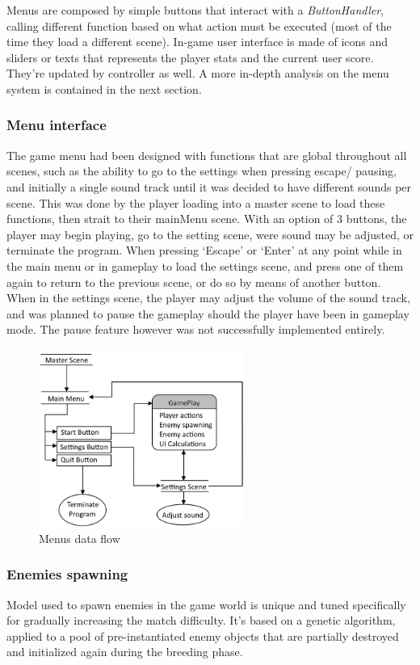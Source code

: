 \documentclass[11pt]{article}
\begin{document}
Menus are composed by simple buttons that interact with a \textit{ButtonHandler}, calling different function based on what action must be executed (most of the time they load a different scene).
In-game user interface is made of icons and sliders or texts that represents the player stats and the current user score. They're updated by controller as well. A more in-depth analysis on the menu system is contained in the next section.

\subsubsection{Menu interface}
The game menu had been designed with functions that are global throughout all scenes, such as the ability to go to the settings when pressing escape/ pausing, and initially a single sound track until it was decided to have different sounds per scene. This was done by the player loading into a master scene to load these functions, then strait to their mainMenu scene. 
With an option of 3 buttons, the player may begin playing, go to the setting scene, were sound may be adjusted, or terminate the program. When pressing ‘Escape’ or ‘Enter’ at any point while in the main menu or in gameplay to load the settings scene, and press one of them again to return to the previous scene, or do so by means of another button. 
When in the settings scene, the player may adjust the volume of the sound track, and was planned to pause the gameplay should the player have been in gameplay mode. The pause feature however was not successfully implemented entirely.

\begin{figure}[H]
  \centering
  \includegraphics[width=0.6\textwidth]{figures/menu_system}
  \caption{Menus data flow}
\end{figure}

\subsubsection{Enemies spawning}
Model used to spawn enemies in the game world is unique and tuned specifically for gradually increasing the match difficulty.
It's based on a genetic algorithm, applied to a pool of pre-instantiated enemy objects that are partially destroyed and initialized again during the breeding phase.
\end{document}
